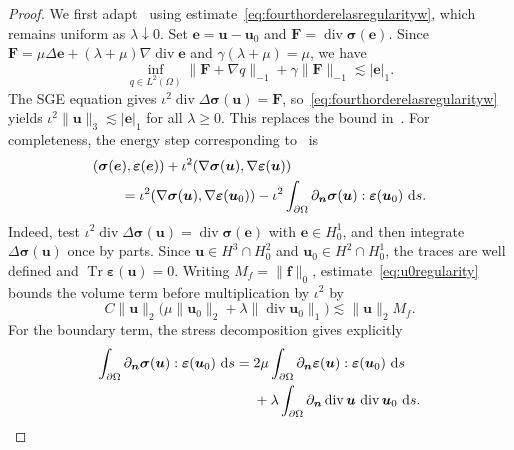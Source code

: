 \documentclass[10pt]{amsart}
\newcommand{\dd}{\,{\rm d}}
\renewcommand{\div}{\operatorname{div}}
\numberwithin{equation}{section}
\begin{document}
\begin{proof}
We first adapt~\cite[Lemma~3.8]{ChenHuangHuang2023} using estimate~\eqref{eq:fourthorderelasregularityw}, which remains uniform as $\lambda\downarrow0$. Set $\boldsymbol e=\boldsymbol u-\boldsymbol u_0$ and $\boldsymbol F=\div\boldsymbol\sigma(\boldsymbol e)$. Since $\boldsymbol F=\mu\Delta\boldsymbol e+(\lambda+\mu)\nabla\div\boldsymbol e$ and $\gamma(\lambda+\mu)=\mu$, we have
\[
\inf_{q\in L^2(\Omega)}\|\boldsymbol F+\nabla q\|_{-1}+\gamma\|\boldsymbol F\|_{-1}\lesssim|\boldsymbol e|_1.
\]
The SGE equation gives $\iota^2\div\Delta\boldsymbol\sigma(\boldsymbol u)=\boldsymbol F$, so~\eqref{eq:fourthorderelasregularityw} yields $\iota^2\|\boldsymbol u\|_3\lesssim|\boldsymbol e|_1$ for all $\lambda\ge0$. This replaces the bound in~\cite[equation~(3.19)]{ChenHuangHuang2023}. For completeness, the energy step corresponding to~\cite[equation~(3.20)]{ChenHuangHuang2023} is
\begin{align*}
&(\boldsymbol\sigma(\boldsymbol e),\boldsymbol\varepsilon(\boldsymbol e))
+\iota^2(\nabla\boldsymbol\sigma(\boldsymbol u),\nabla\boldsymbol\varepsilon(\boldsymbol u))\\
&\qquad=\iota^2(\nabla\boldsymbol\sigma(\boldsymbol u),\nabla\boldsymbol\varepsilon(\boldsymbol u_0))
-\iota^2\int_{\partial\Omega}\partial_{\boldsymbol n}\boldsymbol\sigma(\boldsymbol u):\boldsymbol\varepsilon(\boldsymbol u_0)\,\dd s.
\end{align*}
Indeed, test $\iota^2\div\Delta\boldsymbol\sigma(\boldsymbol u)=\div\boldsymbol\sigma(\boldsymbol e)$ with $\boldsymbol e\in H_0^1$, and then integrate $\Delta\boldsymbol\sigma(\boldsymbol u)$ once by parts. Since $\boldsymbol u\in H^3\cap H_0^2$ and $\boldsymbol u_0\in H^2\cap H_0^1$, the traces are well defined and $\operatorname{Tr}\boldsymbol\varepsilon(\boldsymbol u)=0$.
Writing $M_f=\|\boldsymbol f\|_0$, estimate~\eqref{eq:u0regularity} bounds the volume term before multiplication by $\iota^2$ by
\[
C\|\boldsymbol u\|_2\bigl(\mu\|\boldsymbol u_0\|_2+\lambda\|\div\boldsymbol u_0\|_1\bigr)
\lesssim \|\boldsymbol u\|_2M_f.
\]
For the boundary term, the stress decomposition gives explicitly
\[
\begin{aligned}
\int_{\partial\Omega}\partial_{\boldsymbol n}\boldsymbol\sigma(\boldsymbol u):\boldsymbol\varepsilon(\boldsymbol u_0)\,\dd s
={}&2\mu\int_{\partial\Omega}\partial_{\boldsymbol n}\boldsymbol\varepsilon(\boldsymbol u):\boldsymbol\varepsilon(\boldsymbol u_0)\,\dd s\\
&+\lambda\int_{\partial\Omega}\partial_{\boldsymbol n}\div\boldsymbol u\,\div\boldsymbol u_0\,\dd s.

\end{aligned}\]
\end{proof}
\end{document}
